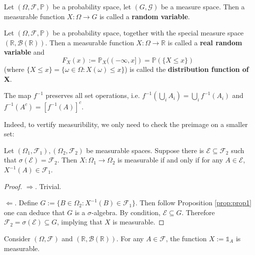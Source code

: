 \documentclass[11pt,singlecolumn, openany, citestyle=authoryear]{elegantbook}
\begin{document}
\begin{CJK}{UTF8}{gbsn}
\begin{definition}
    Let $(\Omega, \mathcal{F} , \mathbb{P} )$ be a probability space, 
    let $(G, \mathcal{G} )$ be a measure space. Then a measurable function
    $X : \Omega \to G$ is called a \textbf{random variable}. 
\end{definition}

\begin{definition}
    Let $(\Omega, \mathcal{F} , \mathbb{P} )$ be a probability space, 
    together with the special measure space $(\mathbb{R}, \mathcal{B}(\mathbb{R}))$.
    Then a measurable function
    $X : \Omega \to \mathbb{R}$ is called a \textbf{real random variable} and 
    $$
    F_X(x) := \mathbb{P}_X ((-\infty,x]) = \mathbb{P}(\{X \leqslant x\}) 
    $$ 
    (where $\{X\leqslant x\} =  \{\omega \in \Omega: X(\omega) \leqslant x\}$)
    is called the \textbf{distribution function of X}.
\end{definition}
\begin{proposition}\label{prop:prop1}
    The map $f^{-1}$ preserves all set operations, i.e.
        $\displaystyle f^{-1}\left(\bigcup_i A_i\right)= \bigcup_i f^{-1}(A_i)$ and 
        $f^{-1}(A^c) = [f^{-1}(A)]^c$.
\end{proposition}

Indeed, to vertify measuribility, we only need to check the preimage on a smaller set:
\begin{lemma}\label{lem:lem1}
    Let $(\Omega_1,\mathcal{F}_1),(\Omega_2,\mathcal{F}_2)$ be measurable spaces. Suppose 
    there is $\mathcal{E}\subseteq \mathcal{F}_2$ such that 
    $\sigma(\mathcal{E})=\mathcal{F}_2$. Then $X:\Omega_1 \to \Omega_2$ is measurable if and 
    only if for any $A \in \mathcal{E}$, $X^{-1}(A)\in \mathcal{F}_1$.
\end{lemma}
\begin{proof}
    $\Longrightarrow$. Trivial.

    $\Longleftarrow$. Define $G:= \{B \in \Omega_2:X^{-1}(B)\in \mathcal{F}_1\}$. Then 
    follow Proposition \ref{prop:prop1} one can deduce that $G$ is a $\sigma$-algebra.
    By condition, $\mathcal{E}\subseteq G$. Therefore $\mathcal{F}_2 = 
    \sigma(\mathcal{E})\subseteq G$, implying that $X$ is measurable.
\end{proof}

\begin{example}
    Consider $(\Omega,\mathcal{F})$ and $(\mathbb{R},\mathcal{B}(\mathbb{R}))$. For 
    any $A \in \mathcal{F}$, the function $X := \mathds{1}_A$ is measurable.
    

\end{example}
\end{CJK}
\end{document}
